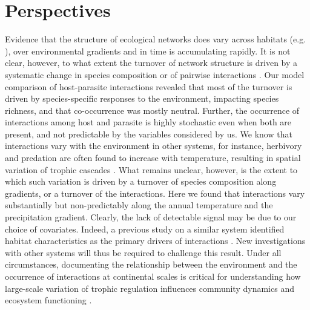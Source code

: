 \documentclass[12pt]{article}
\begin{document}
\section*{Perspectives}

Evidence that the structure of ecological networks does vary across habitats
(e.g. \citealt{Tylianakis2007, Plein2012}), over environmental gradients
\citealt{Lurgi2010} and in time \citep{Trolsgaard2015} is accumulating
rapidly. It is not clear, however, to what extent the turnover of network
structure is driven by a systematic change in species composition or of
pairwise interactions \citep{Poisot2012, Poisot2015a}. Our model comparison of
host-parasite interactions revealed that most of the turnover is driven by
species-specific responses to the environment, impacting species richness, and
that co-occurrence was mostly neutral. Further, the occurrence of interactions
among host and parasite is highly stochastic even when both are present, and
not predictable by the variables considered by us. We know that interactions
vary with the environment in other systems, for instance, herbivory
\citep{Shurin2012} and predation \citep{McKinnon2010, Legagneux2014} are often
found to increase with temperature, resulting in spatial variation of trophic
cascades \citep{(Gray2016}. What remains unclear, however, is the extent to
which such variation is driven by a turnover of species composition along
gradients, or a turnover of the interactions. Here we found that interactions
vary substantially but non-predictably along the annual temperature and the
precipitation gradient. Clearly, the lack of detectable signal may be due to
our choice of covariates. Indeed, a previous study on a similar system
identified habitat characteristics as the primary drivers of interactions
\citep{Nyman2015}. New investigations with other systems will thus be required
to challenge this result. Under all circumstances, documenting the
relationship between the environment and the occurrence of interactions at
continental scales is critical for understanding how large-scale variation of
trophic regulation influences community dynamics and ecosystem functioning
\citep{Harfoot2013}.
\end{document}
